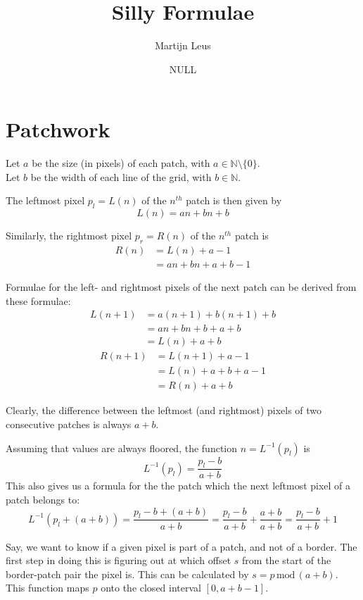 \documentclass{article}
\newcommand{\intervaloo}[2]{\left[#1, #2\right]}
\newcommand{\Mod}{\,\mathrm{mod}\,}
\begin{document}
\title{Silly Formulae}
\author{Martijn Leus}
\date{NULL}

\maketitle

\section{Patchwork}

Let $a$ be the size (in pixels) of each patch, with $a\in\mathbb{N}\setminus\{0\}$.\\
Let $b$ be the width of each line of the grid, with $b\in\mathbb{N}$.

The leftmost pixel $p_l=L(n)$ of the $n^{th}$ patch is then given by
$$L(n)=an + bn + b$$

Similarly, the rightmost pixel  $p_r=R(n)$ of the $n^{th}$ patch is
\begin{align*}
	R(n) &= L(n) + a - 1 \\
	&= an + bn + a + b - 1
\end{align*}

Formulae for the left- and rightmost pixels of the next patch can be derived from these formulae:
\begin{align*}
	L(n+1) &=a(n+1) + b(n+1) + b \\
	&= an + bn + b + a + b \\
	&= L(n) + a + b
\end{align*}
\begin{align*}
	R(n+1) &=L(n+1) + a - 1 \\
	&= L(n) + a + b + a - 1 \\
	&= R(n) + a + b
\end{align*}

Clearly, the difference between the leftmost (and rightmost) pixels of two consecutive patches is always $a + b$.

Assuming that values are always floored, the function $n=L^{-1}(p_l)$ is
$$L^{-1}(p_l)={\frac{p_l-b}{a+b}}$$
This also gives us a formula for the the patch which the next leftmost pixel of a patch belongs to:
$$L^{-1}(p_l + (a + b))=\frac{p_l-b+(a+b)}{a+b}=\frac{p_l-b}{a+b}+\frac{a+b}{a+b}=\frac{p_l-b}{a+b}+1$$

Say, we want to know if a given pixel is part of a patch, and not of a border. The first step in doing this is figuring out at which offset $s$ from the start of the border-patch pair the pixel is. This can be calculated by $s=p\Mod(a + b)$. This function maps $p$ onto the closed interval $\intervaloo{0}{a+b-1}$.
\end{document}
